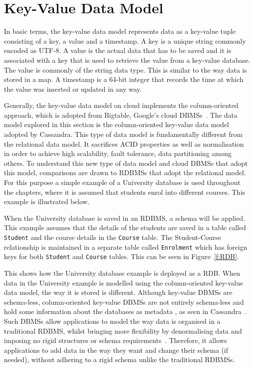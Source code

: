\section{Key-Value Data Model}\label{s:key-value-data-model}
In basic terms,   the key-value data model represents data as a key-value tuple
consisting of a key,   a value and a timestamp.  A key is a unique string
commonly encoded as UTF-8.  A value is the actual data that has to be saved and
it is associated with a key that is used to retrieve the value from a key-value
database.  The value is commonly of the string data type.
This is similar to the way data is stored in a map.  A timestamp is a 64-bit
integer that records the time at which the value was inserted or updated in any
way.

Generally,   the key-value data model on cloud implements the column-oriented
approach,   which is adopted from Bigtable,   Google's cloud
\acp{DBMS}~\citep{bigtable}.
The data model explored in this section is the column-oriented key-value data model adopted by Cassandra.  This type of data model is
fundamentally different from the relational data model.  It sacrifices ACID
properties as well as normalisation in order to achieve high scalability,  
fault tolerance,   data partitioning among others.  To understand this new type
of data model and cloud \acp{DBMS} that adopt this model,   comparisons are
drawn to \acp{RDBMS} that adopt the relational model.  For this purpose a simple
example of a University database is used throughout the chapters,   where it is
assumed that students enrol into different courses.  This example is illustrated
below.

When the University database is saved in an \ac{RDBMS},   a schema will be
applied. This example assumes that the details of the students are saved in a
table called \texttt{Student} and the course details in the \texttt{Course}
table. The Student-Course relationship is maintained in a separate table called
\texttt{Enrolment} which has foreign keys for both \texttt{Student} and
\texttt{Course} tables.  This can be seen in Figure~\ref{f:RDB}. 
 
 

This shows how the University database example is deployed as a \ac{RDB}.  When
data in the University example is modelled using the column-oriented key-value
data model,   the way it is stored is different.
Although key-value \acp{DBMS} are schema-less,   column-oriented key-value
\acp{DBMS} are not entirely schema-less and hold some information about the
databases as metadata , as seen in Cassandra~\citep{datastaxDataModel}.
Such \acp{DBMS} allow applications to model the way data is organised in a
traditional \ac{RDBMS}, whilst bringing more flexibility by denormalising data
and imposing no rigid structures or schema
requirements~\citep{datastaxDataModel,BOOK,cassandra}.
Therefore,   it allows applications to add data in the way they want and change
their schema (if needed),   without adhering to a rigid schema unlike the
traditional \acp{RDBMS}.

